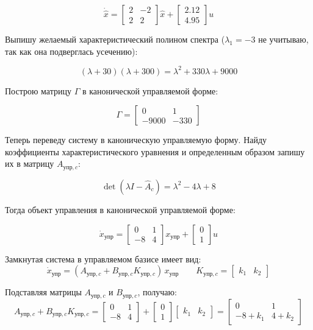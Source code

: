 \documentclass[a4paper,12pt]{article}
\begin{document}
\[
\dot{\hat x} = \begin{bmatrix}
	2 & -2 \\
	2 & 2
\end{bmatrix} \hat x + \begin{bmatrix}
	2.12 \\ 4.95
\end{bmatrix} u
\]

Выпишу желаемый характеристический полином спектра ($\lambda_1 = -3$ не учитываю, так как она подверглась усечению):

\[
(\lambda + 30)(\lambda + 300) = \lambda^2 + 330 \lambda + 9000
\]

Построю матрицу \(\Gamma\) в канонической управляемой форме:

\[
\Gamma = \begin{bmatrix}
	0 & 1 \\ -9000 & -330
\end{bmatrix}
\]

Теперь переведу систему в каноническую управляемую форму. Найду коэффициенты характеристического уравнения и определенным образом запишу их в матрицу \(A_{\text{упр},c}\):

\[
\operatorname{det}(\lambda I - \hat A_c) = \lambda^2 -4 \lambda + 8
\]

Тогда объект управления в канонической управляемой форме:

\[
\dot{x}_{\text{упр}} = 
\begin{bmatrix}
	0&1\\-8&4
\end{bmatrix} x_{\text{упр}} +
\begin{bmatrix}
	0 \\ 1
\end{bmatrix} u
\]

Замкнутая система в управляемом базисе имеет вид:
\[
\dot{x}_{\text{упр}} =
(A_{\text{упр},c} + B_{\text{упр},c} K_{\text{упр},c})\,x_{\text{упр}}
\qquad
K_{\text{упр},c} =
\begin{bmatrix}
	k_1 & k_2
\end{bmatrix}
\]

Подставляя матрицы \(A_{\text{упр},c}\) и \(B_{\text{упр},c}\), получаю:
\[
A_{\text{упр},c} + B_{\text{упр},c} K_{\text{упр},c}
=
\begin{bmatrix}
	0 & 1\\
	-8 & 4
\end{bmatrix}
+
\begin{bmatrix}
	0\\
	1
\end{bmatrix}
\begin{bmatrix}
	k_1 & k_2
\end{bmatrix}
=
\begin{bmatrix}
	0 & 1\\
	-8 + k_1 & 4 + k_2
\end{bmatrix}
\]
\end{document}
